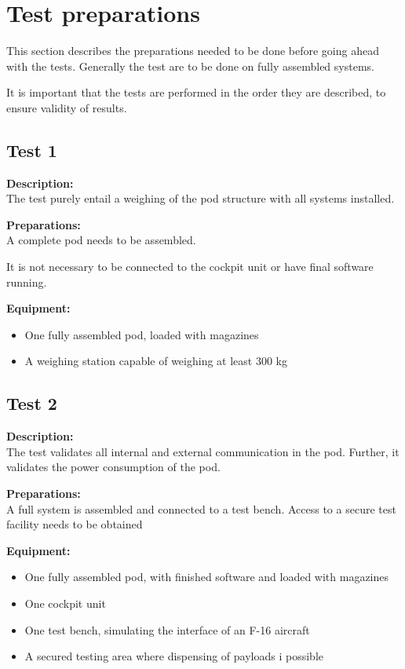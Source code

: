 \documentclass[Main]{subfiles}
\begin{document}
\setcounter{chapter}{2}
\chapter{Test preparations}
This section describes the preparations needed to be done before going ahead with the tests.
Generally the test are to be done on fully assembled systems.

It is important that the tests are performed in the order they are described, to ensure validity of results.

\section{Test 1}
\textbf{Description: }\\
The test purely entail a weighing of the pod structure with all systems installed.

\textbf{Preparations: }\\
A complete pod needs to be assembled. 

It is not necessary to be connected to the cockpit unit or have final software running.

\textbf{Equipment:}
\begin{itemize}
\item One fully assembled pod, loaded with magazines
\item A weighing station capable of weighing at least 300 kg
\end{itemize}


\newpage
\section{Test 2}
\textbf{Description: }\\
The test validates all internal and external communication in the pod.
Further, it validates the power consumption of the pod.

\textbf{Preparations: }\\
A full system is assembled and connected to a test bench.
Access to a secure test facility needs to be obtained

\textbf{Equipment:}
\begin{itemize}
\item One fully assembled pod, with finished software and loaded with magazines
\item One cockpit unit
\item One test bench, simulating the interface of an F-16 aircraft
\item A secured testing area where dispensing of payloads i possible

\end{itemize}
\end{document}

